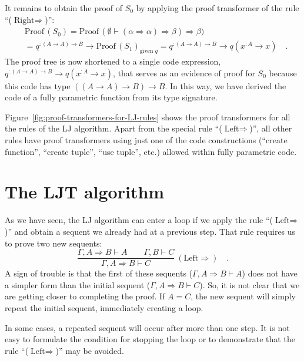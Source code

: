 It remains to obtain the proof of $S_{0}$ by applying the proof transformer
of the rule \textsf{``}($\text{Right}\Rightarrow$)\textsf{''}:
\begin{align*}
 & \text{Proof}\,(S_{0})=\text{Proof}\,(\emptyset\vdash(\alpha\Rightarrow\alpha)\Rightarrow\beta)\Rightarrow\beta)\\
 & =q^{:(A\rightarrow A)\rightarrow B}\rightarrow\text{Proof}\,(S_{1})_{\text{given }q}=q^{:(A\rightarrow A)\rightarrow B}\rightarrow q(x^{:A}\rightarrow x)\quad.
\end{align*}
The proof tree is now shortened to a single code expression, $q^{:(A\rightarrow A)\rightarrow B}\rightarrow q(x^{:A}\rightarrow x)$,
that serves as an evidence of proof for $S_{0}$ because this code
has type $\left(\left(A\rightarrow A\right)\rightarrow B\right)\rightarrow B$.
In this way, we have derived the code of a fully parametric function
from its type signature.

Figure~\ref{fig:proof-transformers-for-LJ-rules} shows the proof
transformers for all the rules of the LJ algorithm. Apart from the
special rule \textsf{``}($\text{Left}\Rightarrow$)\textsf{''}, all other rules have
proof transformers using just one of the code constructions (\textsf{``}create
function\textsf{''}, \textsf{``}create tuple\textsf{''}, \textsf{``}use tuple\textsf{''}, etc.) allowed within
fully parametric code.

\section{The LJT algorithm}

As we have seen, the LJ algorithm can enter a loop if we apply the
rule \textsf{``}($\text{Left}\Rightarrow$)\textsf{''} and obtain a sequent we already
had at a previous step. That rule requires us to prove two new sequents:
\[
\frac{\Gamma,A\Rightarrow B\vdash A\quad\quad\Gamma,B\vdash C}{\Gamma,A\Rightarrow B\vdash C}~(\text{Left}\Rightarrow)\quad.
\]
A sign of trouble is that the first of these sequents ($\Gamma,A\Rightarrow B\vdash A$)
does not have a simpler form than the initial sequent ($\Gamma,A\Rightarrow B\vdash C$).
So, it is not clear that we are getting closer to completing the proof.
If $A=C$, the new sequent will simply repeat the initial sequent,
immediately creating a loop.

In some cases, a repeated sequent will occur after more than one step.
It is not easy to formulate the condition for stopping the loop or
to demonstrate that the rule \textsf{``}($\text{Left}\Rightarrow$)\textsf{''} may
be avoided.

